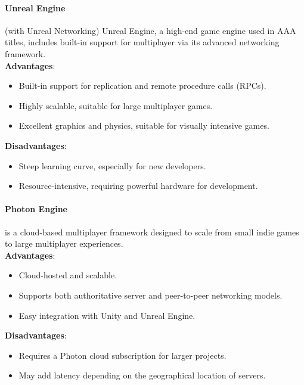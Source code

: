 \documentclass{article} %
\begin{document}
\paragraph{Unreal Engine} (with Unreal Networking) Unreal Engine,
a high-end game engine used in AAA titles, includes built-in support for multiplayer via its advanced networking framework.
\\
\textbf{Advantages}:
\begin{itemize}
    \item Built-in support for replication and remote procedure calls (RPCs).
    \item Highly scalable, suitable for large multiplayer games.
    \item Excellent graphics and physics, suitable for visually intensive games.
\end{itemize}
\textbf{Disadvantages}:
\begin{itemize}
    \item Steep learning curve, especially for new developers.
    \item Resource-intensive, requiring powerful hardware for development.
\end{itemize}

\paragraph{Photon Engine} is a cloud-based multiplayer framework designed to scale from small indie games to large multiplayer experiences.
\\
\textbf{Advantages}:
\begin{itemize}
    \item Cloud-hosted and scalable.
    \item Supports both authoritative server and peer-to-peer networking models.
    \item Easy integration with Unity and Unreal Engine.
\end{itemize}
\textbf{Disadvantages}:
\begin{itemize}
    \item Requires a Photon cloud subscription for larger projects.
    \item May add latency depending on the geographical location of servers.
\end{itemize}
\end{document}
